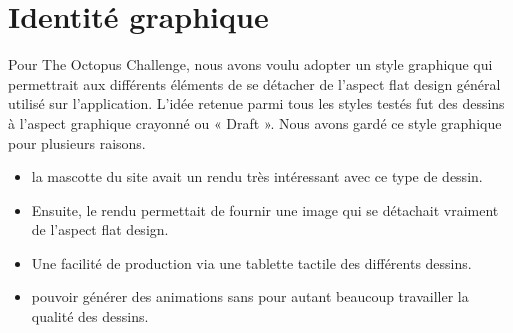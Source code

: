 \documentclass[a4paper,11pt, oneside]{book}
\def\appName{The Octopus Challenge}
\def\octopusName{Lord Octopus}
\begin{document}
\section{Identité graphique}
Pour \appName, nous avons voulu adopter un style graphique qui permettrait aux différents éléments de se détacher de l’aspect flat design général utilisé sur l’application.
L’idée retenue parmi tous les styles testés fut des dessins à l’aspect graphique crayonné ou « Draft ».
Nous avons gardé ce style graphique pour plusieurs raisons.
\begin{itemize}
	\item la mascotte du site avait un rendu très intéressant avec ce type de dessin.
	\item Ensuite, le rendu permettait de fournir une image qui se détachait vraiment de l’aspect flat design.
	\item Une facilité de production via une tablette tactile des différents dessins.
	\item pouvoir générer des animations sans pour autant beaucoup travailler la qualité des dessins.
\end{itemize}

%
\end{document}

